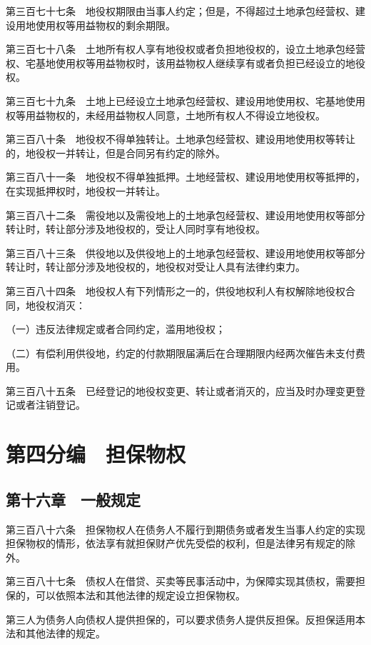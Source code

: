 \documentclass[UTF8,12pt,a4paper]{ctexbook}
\begin{document}
第三百七十七条　地役权期限由当事人约定；但是，不得超过土地承包经营权、建设用地使用权等用益物权的剩余期限。

第三百七十八条　土地所有权人享有地役权或者负担地役权的，设立土地承包经营权、宅基地使用权等用益物权时，该用益物权人继续享有或者负担已经设立的地役权。

第三百七十九条　土地上已经设立土地承包经营权、建设用地使用权、宅基地使用权等用益物权的，未经用益物权人同意，土地所有权人不得设立地役权。

第三百八十条　地役权不得单独转让。土地承包经营权、建设用地使用权等转让的，地役权一并转让，但是合同另有约定的除外。

第三百八十一条　地役权不得单独抵押。土地经营权、建设用地使用权等抵押的，在实现抵押权时，地役权一并转让。

第三百八十二条　需役地以及需役地上的土地承包经营权、建设用地使用权等部分转让时，转让部分涉及地役权的，受让人同时享有地役权。

第三百八十三条　供役地以及供役地上的土地承包经营权、建设用地使用权等部分转让时，转让部分涉及地役权的，地役权对受让人具有法律约束力。

第三百八十四条　地役权人有下列情形之一的，供役地权利人有权解除地役权合同，地役权消灭：

（一）违反法律规定或者合同约定，滥用地役权；

（二）有偿利用供役地，约定的付款期限届满后在合理期限内经两次催告未支付费用。

第三百八十五条　已经登记的地役权变更、转让或者消灭的，应当及时办理变更登记或者注销登记。

\cleardoublepage
{}
\chapter*{第四分编　担保物权}

\section*{第十六章　一般规定}

第三百八十六条　担保物权人在债务人不履行到期债务或者发生当事人约定的实现担保物权的情形，依法享有就担保财产优先受偿的权利，但是法律另有规定的除外。

第三百八十七条　债权人在借贷、买卖等民事活动中，为保障实现其债权，需要担保的，可以依照本法和其他法律的规定设立担保物权。

第三人为债务人向债权人提供担保的，可以要求债务人提供反担保。反担保适用本法和其他法律的规定。
\end{document}
